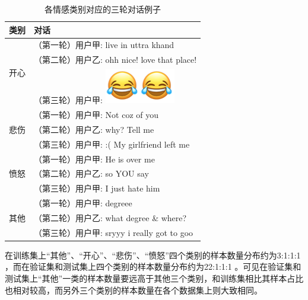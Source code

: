 \begin{table}[]
  \centering
  \begin{minipage}[t]{0.7\linewidth}
  \caption{各情感类别对应的三轮对话例子}
  \label{tab:semeval_2019_task3_sample}
  \begin{tabularx}{\linewidth}{c|l}
  \toprule[1.5pt]
   类别 & 对话    \\
  \hline
  \multirow{3}{*}{开心} 
    &   （第一轮）用户甲: live in uttra khand \\
    &   （第二轮）用户乙: ohh nice! love that place! \\
    &   （第三轮）用户甲: \includegraphics[height=1.5\fontcharht\font`\B]{img/emoji/lol.png}\includegraphics[height=1.5\fontcharht\font`\B]{img/emoji/lol.png} \\
  \hline
  \multirow{3}{*}{悲伤} 
    &   （第一轮）用户甲: Not coz of you  \\
    &   （第二轮）用户乙: why? Tell me  \\
    &   （第三轮）用户甲: :( My girlfriend left me \\
  \hline
  \multirow{3}{*}{愤怒} 
    &   （第一轮）用户甲: He is over me \\
    &   （第二轮）用户乙: so YOU say \\
    &   （第三轮）用户甲: I just hate him \\
  \hline
  \multirow{3}{*}{其他} 
    &   （第一轮）用户甲: degreee \\
    &   （第二轮）用户乙: what degree \& where? \\
    &   （第三轮）用户甲: sryyy i really got to goo \\
  \bottomrule[1.5pt]
  \end{tabularx}
  \end{minipage}
\end{table}


在训练集上“其他”、“开心”、“悲伤”、“愤怒”四个类别的样本数量分布约为3:1:1:1 ，而在验证集和测试集上四个类别的样本数量分布约为22:1:1:1 。可见在验证集和测试集上“其他”一类的样本数量要远高于其他三个类别，和训练集相比其样本占比也相对较高，而另外三个类别的样本数量在各个数据集上则大致相同。

